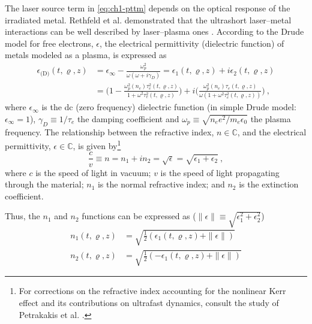 The laser source term in \eqref{eq:ch1-pttm} depends on the optical response of the irradiated metal.
Rethfeld et al. demonstrated that the ultrashort laser--metal interactions can be well described by laser--plasma ones \cite{Rethfeld_2002}. According to the Drude model for free electrons, $\epsilon$, the electrical permittivity (dielectric function) of metals modeled as a plasma, is expressed as
\begin{align*}
  \epsilon_{\text{(D)}}(t,\varrho,z) & =
  \epsilon_{\infty} - \frac{\omega_p^2}{\omega (\omega + i\gamma_D)} = \epsilon_1(t,\varrho,z)  + i \epsilon_2(t,\varrho,z)                                                                                                                                 \\
                                     & = \biggl( 1 - \frac{\omega_p^2(n_e) \tau_e^2(t,\varrho,z)}{1 + \omega^2 \tau_e^2(t,\varrho,z)} \biggr) + i \biggl(\frac{\omega_p^2(n_e) \tau_e(t,\varrho,z)}{\omega(1 + \omega^2 \tau_e^2(t,\varrho,z))} \biggr) \ ,
\end{align*}
where $\epsilon_\infty$ is the dc (zero frequency) dielectric function (in simple Drude model: $\epsilon_\infty = 1$), $\gamma_D\equiv 1/\tau_e$ the damping coefficient and
$\omega_p \equiv \sqrt{n_e e^2/ m_e \epsilon_0}$ the plasma frequency. The relationship between the refractive index, $n \in \mathbb{C}$, and the electrical permittivity, $\epsilon \in \mathbb{C}$, is given by\footnote{
  For corrections on the refractive index accounting for the nonlinear Kerr effect and its contributions on ultrafast dynamics, consult the study of Petrakakis et al. \cite{Petrakakis_2019}.
}
\begin{equation}
  \frac{c}{v} \equiv n = n_1 + i n_2 = \sqrt{\epsilon} = \sqrt{\epsilon_1 + \epsilon_2} \ ,
\end{equation}
where $c$ is the speed of light in vacuum; $v$ is the speed of light propagating through the material; $n_1$ is the normal refractive index;
and $n_2$ is the extinction coefficient.

\noindent
Thus, the $n_1$ and $n_2$ functions can be expressed as ($\| \epsilon \| \equiv \sqrt{\epsilon_1^2 + \epsilon_2^2}$)
\begin{subequations} \label{eq:ch1-coeffs_refractive_index}
  \begin{align}
    n_1(t,\varrho,z) & = \sqrt{\frac{1}{2} ( \epsilon_1 (t, \varrho, z) + \| \epsilon \| )}  \\
    n_2(t,\varrho,z) & = \sqrt{\frac{1}{2} ( -\epsilon_1 (t, \varrho, z) + \| \epsilon \| )}
  \end{align}
\end{subequations}

